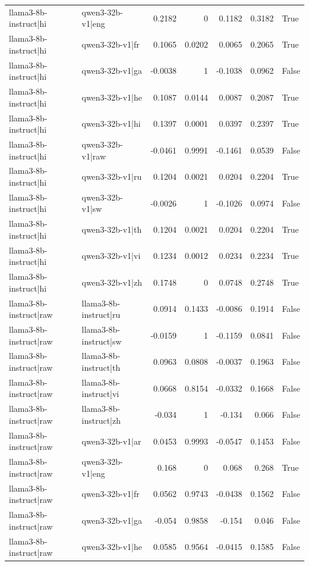 \begin{table}
\begin{tabular}{l l r r r r l}
llama3-8b-instruct|hi & qwen3-32b-v1|eng & 0.2182 & 0 & 0.1182 & 0.3182 & True \\
llama3-8b-instruct|hi & qwen3-32b-v1|fr & 0.1065 & 0.0202 & 0.0065 & 0.2065 & True \\
llama3-8b-instruct|hi & qwen3-32b-v1|ga & -0.0038 & 1 & -0.1038 & 0.0962 & False \\
llama3-8b-instruct|hi & qwen3-32b-v1|he & 0.1087 & 0.0144 & 0.0087 & 0.2087 & True \\
llama3-8b-instruct|hi & qwen3-32b-v1|hi & 0.1397 & 0.0001 & 0.0397 & 0.2397 & True \\
llama3-8b-instruct|hi & qwen3-32b-v1|raw & -0.0461 & 0.9991 & -0.1461 & 0.0539 & False \\
llama3-8b-instruct|hi & qwen3-32b-v1|ru & 0.1204 & 0.0021 & 0.0204 & 0.2204 & True \\
llama3-8b-instruct|hi & qwen3-32b-v1|sw & -0.0026 & 1 & -0.1026 & 0.0974 & False \\
llama3-8b-instruct|hi & qwen3-32b-v1|th & 0.1204 & 0.0021 & 0.0204 & 0.2204 & True \\
llama3-8b-instruct|hi & qwen3-32b-v1|vi & 0.1234 & 0.0012 & 0.0234 & 0.2234 & True \\
llama3-8b-instruct|hi & qwen3-32b-v1|zh & 0.1748 & 0 & 0.0748 & 0.2748 & True \\
llama3-8b-instruct|raw & llama3-8b-instruct|ru & 0.0914 & 0.1433 & -0.0086 & 0.1914 & False \\
llama3-8b-instruct|raw & llama3-8b-instruct|sw & -0.0159 & 1 & -0.1159 & 0.0841 & False \\
llama3-8b-instruct|raw & llama3-8b-instruct|th & 0.0963 & 0.0808 & -0.0037 & 0.1963 & False \\
llama3-8b-instruct|raw & llama3-8b-instruct|vi & 0.0668 & 0.8154 & -0.0332 & 0.1668 & False \\
llama3-8b-instruct|raw & llama3-8b-instruct|zh & -0.034 & 1 & -0.134 & 0.066 & False \\
llama3-8b-instruct|raw & qwen3-32b-v1|ar & 0.0453 & 0.9993 & -0.0547 & 0.1453 & False \\
llama3-8b-instruct|raw & qwen3-32b-v1|eng & 0.168 & 0 & 0.068 & 0.268 & True \\
llama3-8b-instruct|raw & qwen3-32b-v1|fr & 0.0562 & 0.9743 & -0.0438 & 0.1562 & False \\
llama3-8b-instruct|raw & qwen3-32b-v1|ga & -0.054 & 0.9858 & -0.154 & 0.046 & False \\
llama3-8b-instruct|raw & qwen3-32b-v1|he & 0.0585 & 0.9564 & -0.0415 & 0.1585 & False \\

\end{tabular}
\end{table}
